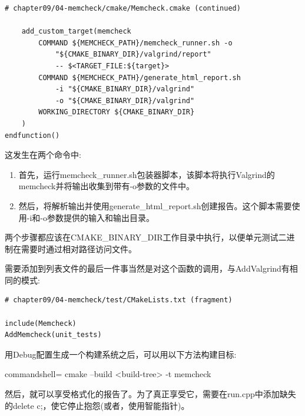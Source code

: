\begin{lstlisting}[style=styleCMake]
# chapter09/04-memcheck/cmake/Memcheck.cmake (continued)

	add_custom_target(memcheck
		COMMAND ${MEMCHECK_PATH}/memcheck_runner.sh -o
			"${CMAKE_BINARY_DIR}/valgrind/report"
			-- $<TARGET_FILE:${target}>
		COMMAND ${MEMCHECK_PATH}/generate_html_report.sh
			-i "${CMAKE_BINARY_DIR}/valgrind"
			-o "${CMAKE_BINARY_DIR}/valgrind"
		WORKING_DIRECTORY ${CMAKE_BINARY_DIR}
	)
endfunction()
\end{lstlisting}

这发生在两个命令中:

\begin{enumerate}
\item 
首先，运行memcheck\_runner.sh包装器脚本，该脚本将执行Valgrind的memcheck并将输出收集到带有-o参数的文件中。

\item 
然后，将解析输出并使用generate\_html\_report.sh创建报告。这个脚本需要使用-i和-o参数提供的输入和输出目录。
\end{enumerate}

两个步骤都应该在CMAKE\_BINARY\_DIR工作目录中执行，以便单元测试二进制在需要时通过相对路径访问文件。

需要添加到列表文件的最后一件事当然是对这个函数的调用，与AddValgrind有相同的模式:

\begin{lstlisting}[style=styleCMake]
# chapter09/04-memcheck/test/CMakeLists.txt (fragment)

include(Memcheck)
AddMemcheck(unit_tests)
\end{lstlisting}

用Debug配置生成一个构建系统之后，可以用以下方法构建目标:

\begin{tcblisting}{commandshell={}}
cmake --build <build-tree> -t memcheck
\end{tcblisting}

然后，就可以享受格式化的报告了。为了真正享受它，需要在run.cpp中添加缺失的delete c;，使它停止抱怨(或者，使用智能指针)。









